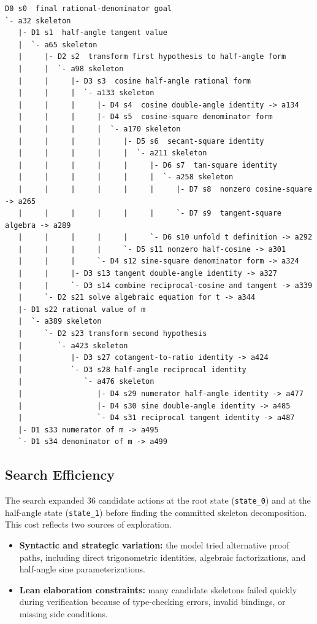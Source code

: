\begin{lstlisting}[basicstyle=\scriptsize\ttfamily,columns=fullflexible,keepspaces=true,breaklines=true,showstringspaces=false]
D0 s0  final rational-denominator goal
`- a32 skeleton
   |- D1 s1  half-angle tangent value
   |  `- a65 skeleton
   |     |- D2 s2  transform first hypothesis to half-angle form
   |     |  `- a98 skeleton
   |     |     |- D3 s3  cosine half-angle rational form
   |     |     |  `- a133 skeleton
   |     |     |     |- D4 s4  cosine double-angle identity -> a134
   |     |     |     |- D4 s5  cosine-square denominator form
   |     |     |     |  `- a170 skeleton
   |     |     |     |     |- D5 s6  secant-square identity
   |     |     |     |     |  `- a211 skeleton
   |     |     |     |     |     |- D6 s7  tan-square identity
   |     |     |     |     |     |  `- a258 skeleton
   |     |     |     |     |     |     |- D7 s8  nonzero cosine-square -> a265
   |     |     |     |     |     |     `- D7 s9  tangent-square algebra -> a289
   |     |     |     |     |     `- D6 s10 unfold t definition -> a292
   |     |     |     |     `- D5 s11 nonzero half-cosine -> a301
   |     |     |     `- D4 s12 sine-square denominator form -> a324
   |     |     |- D3 s13 tangent double-angle identity -> a327
   |     |     `- D3 s14 combine reciprocal-cosine and tangent -> a339
   |     `- D2 s21 solve algebraic equation for t -> a344
   |- D1 s22 rational value of m
   |  `- a389 skeleton
   |     `- D2 s23 transform second hypothesis
   |        `- a423 skeleton
   |           |- D3 s27 cotangent-to-ratio identity -> a424
   |           `- D3 s28 half-angle reciprocal identity
   |              `- a476 skeleton
   |                 |- D4 s29 numerator half-angle identity -> a477
   |                 |- D4 s30 sine double-angle identity -> a485
   |                 `- D4 s31 reciprocal tangent identity -> a487
   |- D1 s33 numerator of m -> a495
   `- D1 s34 denominator of m -> a499
\end{lstlisting}

\subsection{Search Efficiency}

The search expanded 36 candidate actions at the root state (\texttt{state\_0}) and at the half-angle
state (\texttt{state\_1}) before finding the committed skeleton decomposition. This cost reflects two
sources of exploration.

\begin{itemize}
    \item \textbf{Syntactic and strategic variation:} the model tried alternative proof paths, including
    direct trigonometric identities, algebraic factorizations, and half-angle sine parameterizations.
    \item \textbf{Lean elaboration constraints:} many candidate skeletons failed quickly during verification
    because of type-checking errors, invalid bindings, or missing side conditions.
\end{itemize}

